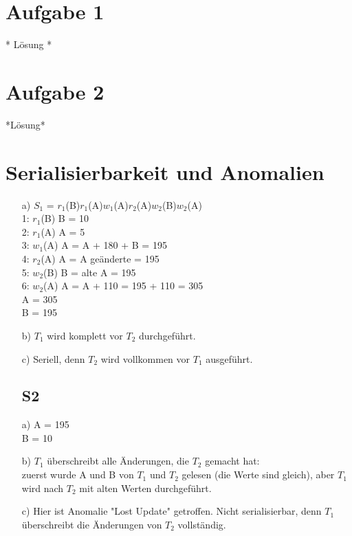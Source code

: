 \documentclass[a4paper,12pt]{scrartcl}
\begin{document}
\section{Aufgabe 1}
* L\"osung *

\section{Aufgabe 2}
*L\"osung*

\section{Serialisierbarkeit und Anomalien} 	
\begin{enumerate}
\subsection*{S1}
	\item[a)]
	\(S_1\) = \(r_1\)(B)\(r_1\)(A)\(w_1\)(A)\(r_2\)(A)\(w_2\)(B)\(w_2\)(A)\\
	1: \(r_1\)(B)  B = 10\\
	2: \(r_1\)(A)  A = 5\\
	3: \(w_1\)(A)  A = A + 180 + B = 195\\
	4: \(r_2\)(A)  A = A ge\"anderte = 195\\
	5: \(w_2\)(B)  B = alte A = 195\\
	6: \(w_2\)(A)  A = A + 110 = 195 + 110 = 305\\
	A = 305\\
	B = 195
	
	\item[b)]
	\(T_1\) wird komplett vor \(T_2\) durchgeführt.
	
	\item[c)]
	Seriell, denn \(T_2\) wird vollkommen vor \(T_1\) ausgeführt.
	
\subsection*{S2}
	\item[a)]
	A = 195\\
	B = 10
	\item[b)]
	\(T_1\) überschreibt alle Änderungen, die \(T_2\) gemacht hat: \\
	zuerst wurde A und B von \(T_1\) und \(T_2\) gelesen (die Werte sind gleich), aber \(T_1\) wird nach \(T_2\) mit alten Werten durchgeführt. 
	\item[c)]
	Hier ist Anomalie "Lost Update" getroffen. Nicht serialisierbar, denn \(T_1\) überschreibt die Änderungen von \(T_2\) vollständig. 
	

\end{enumerate}
\end{document}
